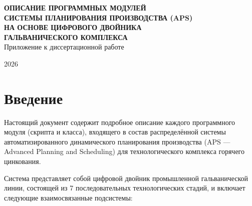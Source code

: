 \documentclass[14pt, a4paper]{extarticle}
\begin{document}
\begin{titlepage}
\begin{center}
\vspace*{2cm}

\textbf{\Large ОПИСАНИЕ ПРОГРАММНЫХ МОДУЛЕЙ}\\[0.5cm]
\textbf{\Large СИСТЕМЫ ПЛАНИРОВАНИЯ ПРОИЗВОДСТВА (APS)}\\[0.5cm]
\textbf{\Large НА ОСНОВЕ ЦИФРОВОГО ДВОЙНИКА}\\[0.5cm]
\textbf{\Large ГАЛЬВАНИЧЕСКОГО КОМПЛЕКСА}\\[2cm]

{\large Приложение к диссертационной работе}\\[3cm]

\vfill

{\large 2026}
\end{center}
\end{titlepage}

\tableofcontents
\newpage

\section{Введение}

Настоящий документ содержит подробное описание каждого программного модуля (скрипта и класса), входящего в состав распределённой системы автоматизированного динамического планирования производства (APS --- Advanced Planning and Scheduling) для технологического комплекса горячего цинкования. 

Система представляет собой цифровой двойник промышленной гальванической линии, состоящей из 7 последовательных технологических стадий, и включает следующие взаимосвязанные подсистемы:
\end{document}
